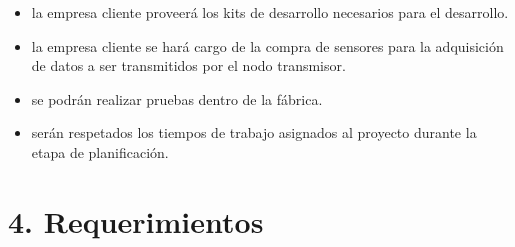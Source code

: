 \documentclass[11pt]{charter}
\begin{document}
\begin{itemize}
\item la empresa cliente proveerá los kits de desarrollo necesarios para el desarrollo.
\item la empresa cliente se hará cargo de la compra de sensores para la adquisición de datos a ser transmitidos por el nodo transmisor.
\item se podrán realizar pruebas dentro de la fábrica.
\item serán respetados los tiempos de trabajo asignados al proyecto durante la etapa de planificación.
\end{itemize}

\section{4. Requerimientos}
\label{sec:requerimientos}
\end{document}
